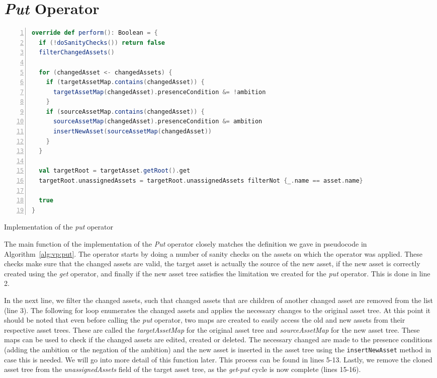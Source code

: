 \section{\emph{Put} Operator}
\begin{lstfloat}
\begin{lstlisting}[language=Scala,numbers=left,showstringspaces=false]
override def perform(): Boolean = {
  if (!doSanityChecks()) return false
  filterChangedAssets()

  for (changedAsset <- changedAssets) {
    if (targetAssetMap.contains(changedAsset)) {
      targetAssetMap(changedAsset).presenceCondition &= !ambition
    }
    if (sourceAssetMap.contains(changedAsset)) {
      sourceAssetMap(changedAsset).presenceCondition &= ambition
      insertNewAsset(sourceAssetMap(changedAsset))
    }
  }

  val targetRoot = targetAsset.getRoot().get
  targetRoot.unassignedAssets = targetRoot.unassignedAssets filterNot {_.name == asset.name}

  true
}
\end{lstlisting}
\caption{Implementation of the \emph{put} operator}
\label{lst:putoperator}
\end{lstfloat}
The main function of the implementation of the \emph{Put} operator closely
matches the definition we gave in pseudocode in Algorithm~\ref{alg:vp:put}.
The operator starts by doing a number of sanity checks on the assets on which
the operator was applied. These checks make sure that the changed assets are
valid, the target asset is actually the source of the new asset, if the
new asset is correctly created using the \emph{get} operator, and finally if
the new asset tree satisfies the limitation we created for the \emph{put}
operator. This is done in line 2.

In the next line, we filter the changed assets, such that changed assets
that are children of another changed asset are removed from the list (line 3).
The following for loop enumerates the changed assets and applies the necessary
changes to the original asset tree. At this point it should be noted that even
before calling the \emph{put} operator, two maps are created to easily access the
old and new assets from their respective asset trees. These are called the 
\emph{targetAssetMap} for the original asset tree and \emph{sourceAssetMap} for
the new asset tree. These maps can be used to check if the changed assets are
edited, created or deleted. The necessary changed are made to the presence conditions
(adding the ambition or the negation of the ambition) and the new asset is inserted
in the asset tree using the \texttt{insertNewAsset} method in case this is needed.
We will go into more detail of this function later. This process can be found in
lines 5-13. Lastly, we remove the cloned asset tree from the \emph{unassignedAssets}
field of the target asset tree, as the \emph{get}-\emph{put} cycle is now complete
(lines 15-16).


